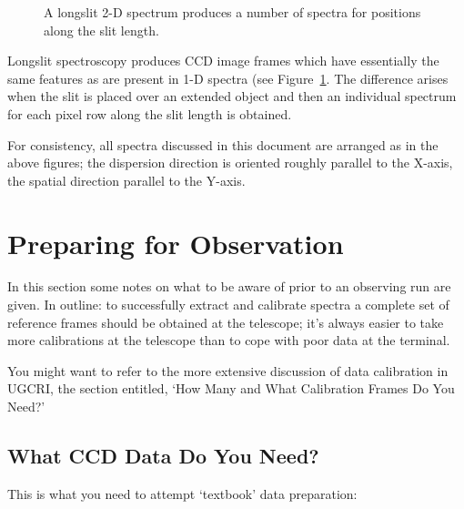 \documentclass[twoside,11pt]{starlink}
\providecommand{\mlabel}[1]{\xlabel{#1}\label{#1}}
\providecommand{\scspec}[2]{#1}
\begin{document}
\begin{figure}
\begin{center}
  \parbox{140mm}{
    \caption{A longslit 2-D spectrum produces a number of spectra for
             positions along the slit length.}
    \label{fi_twod_spectrum}
  }
\end{center}
\end{figure}

Longslit spectroscopy produces CCD image frames which have essentially
the same features as are present in 1-D spectra (see
\scspec{Figure~\ref{fi_twod_spectrum}}{The figure above}. The
difference arises when the slit is placed over an extended object and
then an individual spectrum for each pixel row along the slit length
is obtained.

For consistency, all spectra discussed in this document are arranged
as in the above figures; the dispersion direction is oriented roughly
parallel to the X-axis, the spatial direction parallel to the Y-axis.




\section{\mlabel{preparing_for_observing}Preparing for Observation}


In this section some notes on what to be aware of prior to an observing
run are given.
In outline: to successfully extract and calibrate spectra
a complete set of reference frames should be obtained at the telescope;
it's always easier to take more calibrations at the telescope than to
cope with poor data at the terminal.

You might want to refer to the more extensive discussion of
 data calibration in UGCRI\cite{ugcri},
the section entitled, `How Many and What Calibration Frames
Do You Need?'


\subsection{What CCD Data Do You Need?}

This is what you need to attempt `textbook' data preparation:
\end{document}
